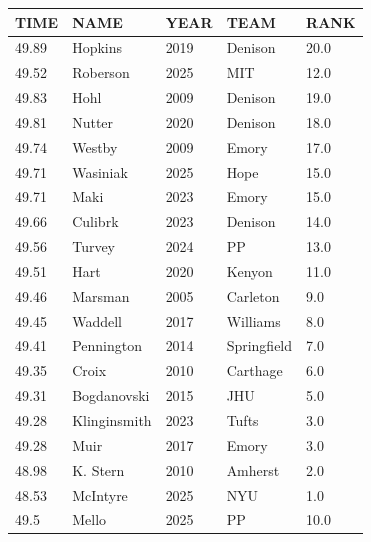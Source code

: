 \begin{table}[H]
\begin{minipage}[t]{0.48\textwidth}
\begin{tabular}{@{}p{1.8cm}p{2.8cm}p{1.2cm}p{1.4cm}p{0.8cm}@{}}
\hline
    \textbf{TIME} & \textbf{NAME} & \textbf{YEAR} & \textbf{TEAM} & \textbf{RANK} \\
\hline
    49.89 & Hopkins & 2019 & Denison & 20.0 \\
    49.52 & Roberson & 2025 & MIT & 12.0 \\
    49.83 & Hohl & 2009 & Denison & 19.0 \\
    49.81 & Nutter & 2020 & Denison & 18.0 \\
    49.74 & Westby & 2009 & Emory & 17.0 \\
    49.71 & Wasiniak & 2025 & Hope & 15.0 \\
    49.71 & Maki & 2023 & Emory & 15.0 \\
    49.66 & Culibrk & 2023 & Denison & 14.0 \\
    49.56 & Turvey & 2024 & PP & 13.0 \\
    49.51 & Hart & 2020 & Kenyon & 11.0 \\
    49.46 & Marsman & 2005 & Carleton & 9.0 \\
    49.45 & Waddell & 2017 & Williams & 8.0 \\
    49.41 & Pennington & 2014 & Springfield & 7.0 \\
    49.35 & Croix & 2010 & Carthage & 6.0 \\
    49.31 & Bogdanovski & 2015 & JHU & 5.0 \\
    49.28 & Klinginsmith & 2023 & Tufts & 3.0 \\
    49.28 & Muir & 2017 & Emory & 3.0 \\
    48.98 & K. Stern & 2010 & Amherst & 2.0 \\
    48.53 & McIntyre & 2025 & NYU & 1.0 \\
    49.5 & Mello & 2025 & PP & 10.0 \\
\hline
\end{tabular}
\end{minipage}
\end{table}

